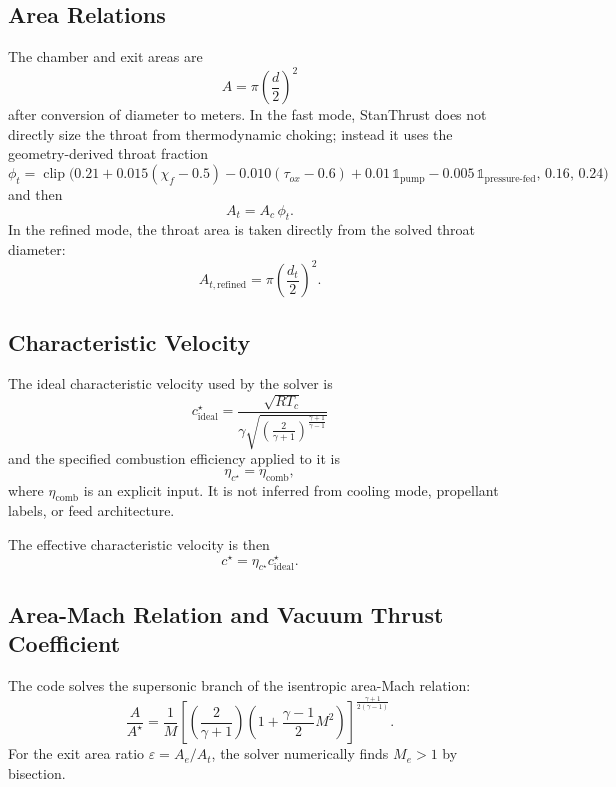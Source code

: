 \documentclass[11pt]{article}
\newcommand{\clip}{\operatorname{clip}}
\begin{document}
\subsection{Area Relations}
The chamber and exit areas are
\begin{equation}
A=\pi\left(\frac{d}{2}\right)^2
\label{eq:area-diameter}
\end{equation}
after conversion of diameter to meters. In the fast mode, StanThrust does not directly size the throat from thermodynamic choking; instead it uses the geometry-derived throat fraction
\begin{equation}
\phi_t
=
\clip\!\Big(
0.21
+0.015(\chi_f-0.5)
-0.010(\tau_{ox}-0.6)
+0.01\,\mathbb{1}_{\text{pump}}
-0.005\,\mathbb{1}_{\text{pressure-fed}},
\,
0.16,\,
0.24
\Big)
\label{eq:throat-fraction}
\end{equation}
and then
\begin{equation}
A_t=A_c\,\phi_t.
\label{eq:throat-area}
\end{equation}
In the refined mode, the throat area is taken directly from the solved throat diameter:
\begin{equation}
A_{t,\mathrm{refined}} = \pi\left(\frac{d_t}{2}\right)^2.
\label{eq:throat-area-refined}
\end{equation}

\subsection{Characteristic Velocity}
The ideal characteristic velocity used by the solver is
\begin{equation}
c^\star_{\text{ideal}}
=
\frac{\sqrt{RT_c}}
{
\gamma
\sqrt{
\left(\frac{2}{\gamma+1}\right)^{\frac{\gamma+1}{\gamma-1}}
}
}
\label{eq:cstar-ideal}
\end{equation}
and the specified combustion efficiency applied to it is
\begin{equation}
\eta_{c^\star}=\eta_{\text{comb}},
\label{eq:cstar-eff}
\end{equation}
where $\eta_{\text{comb}}$ is an explicit input. It is not inferred from cooling mode, propellant labels, or feed architecture.

The effective characteristic velocity is then
\begin{equation}
c^\star=\eta_{c^\star}c^\star_{\text{ideal}}.
\label{eq:cstar}
\end{equation}

\subsection{Area-Mach Relation and Vacuum Thrust Coefficient}
The code solves the supersonic branch of the isentropic area-Mach relation:
\begin{equation}
\frac{A}{A^\star}
=
\frac{1}{M}
\left[
\left(\frac{2}{\gamma+1}\right)
\left(1+\frac{\gamma-1}{2}M^2\right)
\right]^{\frac{\gamma+1}{2(\gamma-1)}}.
\label{eq:area-mach}
\end{equation}
For the exit area ratio $\varepsilon=A_e/A_t$, the solver numerically finds $M_e>1$ by bisection.
\end{document}
